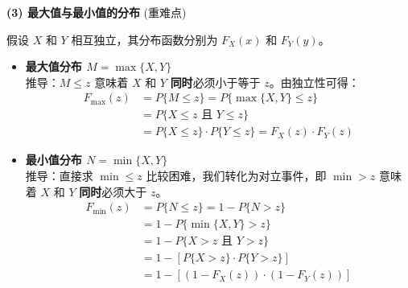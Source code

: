 \vspace{1em}
\textbf{(3) 最大值与最小值的分布} (重难点)

假设 $X$ 和 $Y$ 相互独立，其分布函数分别为 $F_X(x)$ 和 $F_Y(y)$。
\begin{itemize}
    \item \textbf{最大值分布 \quad $M = \max\{X, Y\}$} \\
    推导：$M \le z$ 意味着 $X$ 和 $Y$ \textbf{同时}必须小于等于 $z$。由独立性可得：
    $$ 
    \begin{aligned}
    F_{\max}(z) &= P\{M \le z\} = P\{\max\{X, Y\} \le z\} \\
    &= P\{X \le z \text{ 且 } Y \le z\} \\
    &= P\{X \le z\} \cdot P\{Y \le z\} = F_X(z) \cdot F_Y(z)
    \end{aligned}
    $$
    
    \item \textbf{最小值分布 \quad $N = \min\{X, Y\}$} \\
    推导：直接求 $\min \le z$ 比较困难，我们转化为对立事件，即 $\min > z$ 意味着 $X$ 和 $Y$ \textbf{同时}必须大于 $z$。
    $$ 
    \begin{aligned}
    F_{\min}(z) &= P\{N \le z\} = 1 - P\{N > z\} \\
    &= 1 - P\{\min\{X, Y\} > z\} \\
    &= 1 - P\{X > z \text{ 且 } Y > z\} \\
    &= 1 - [P\{X > z\} \cdot P\{Y > z\}] \\
    &= 1 - [ (1 - F_X(z)) \cdot (1 - F_Y(z)) ]
    \end{aligned}
    $$
\end{itemize}